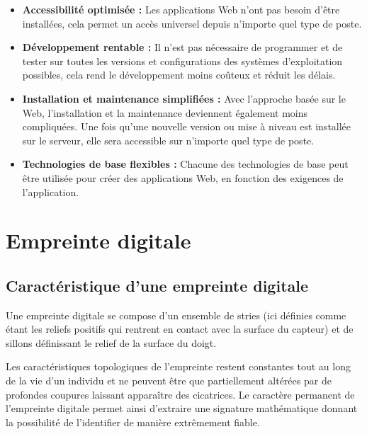 \begin{itemize}
    \item[\textbullet] \textbf{Accessibilité optimisée :} Les
        applications Web n’ont pas besoin d’être installées, cela permet
        un accès universel depuis n’importe quel type de poste.
    
    \item[\textbullet] \textbf{Développement rentable :} Il n'est pas
        nécessaire de programmer et de tester sur toutes les versions et
        configurations des systèmes d'exploitation possibles, cela rend
        le développement moins coûteux et réduit les délais.
    
     \item[\textbullet] \textbf{Installation et maintenance simplifiées :}
        Avec l'approche basée sur le Web, l'installation et la
        maintenance deviennent également moins compliquées. Une fois
        qu'une nouvelle version ou mise à niveau est installée sur le
        serveur, elle sera accessible sur n'importe quel type de poste.
    
    \item[\textbullet] \textbf{Technologies de base flexibles :} Chacune
        des technologies de base peut être utilisée pour créer des
        applications Web, en fonction des exigences de
        l'application.
\end{itemize}
        
   
\section{Empreinte digitale}
\subsection{Caractéristique d’une empreinte digitale}
Une empreinte digitale se compose d’un ensemble de stries (ici définies comme
étant les reliefs positifs qui rentrent en contact avec la surface du capteur)
et de sillons définissant le relief de la surface du doigt. 
            
Les caractéristiques topologiques de l’empreinte restent constantes tout au long
de la vie d’un individu et ne peuvent être que partiellement altérées par de
profondes coupures laissant apparaître des cicatrices. Le caractère permanent de
l’empreinte digitale permet ainsi d’extraire une signature mathématique donnant
la possibilité de l’identifier de manière extrêmement fiable\cite{3}.
        
